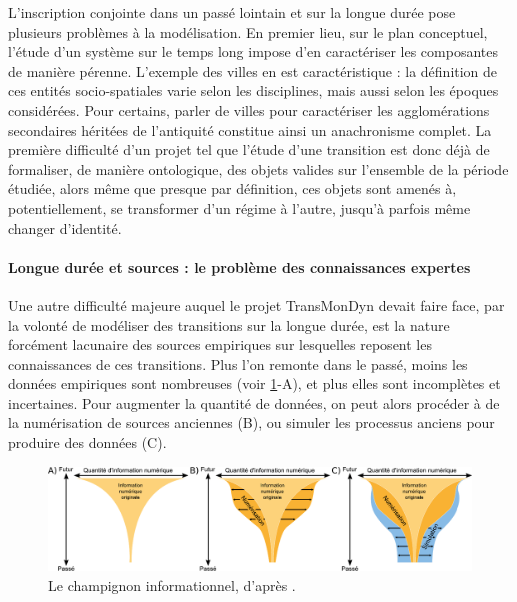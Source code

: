 L'inscription conjointe dans un passé lointain et sur la longue durée pose plusieurs problèmes à la modélisation.
En premier lieu, sur le plan conceptuel, l'étude d'un système sur le temps long impose d'en caractériser les composantes de manière pérenne.
L'exemple des \og villes \fg{} en est caractéristique :
	la définition de ces entités socio-spatiales varie selon les disciplines, mais aussi selon les époques considérées.
Pour certains, parler de villes pour caractériser les agglomérations secondaires héritées de l'antiquité constitue ainsi un anachronisme complet.
La première difficulté d'un projet tel que l'étude d'une transition est donc déjà de formaliser, de manière ontologique, des objets valides sur l'ensemble de la période étudiée, alors même que presque par définition, ces objets sont amenés à, potentiellement, se transformer d'un régime à l'autre, jusqu'à parfois même changer d'identité.

\paragraph{Longue durée et sources : le problème des \og connaissances expertes\fg{}}

Une autre difficulté majeure auquel le projet TransMonDyn devait faire face, par la volonté de modéliser des transitions sur la longue durée, est la nature forcément lacunaire des sources empiriques sur lesquelles reposent les connaissances de ces transitions.
Plus l'on remonte dans le passé, moins les données empiriques sont nombreuses (voir \cref{fig:champignon-kaplan}-A), et plus elles sont incomplètes et incertaines.
Pour augmenter la quantité de données, on peut alors procéder à de la numérisation de sources anciennes (B), ou simuler les processus anciens pour produire des données (C).

\begin{figure}[H]
	\centering
	\includegraphics[width=\linewidth]{img/champignon_informationnel_kaplan.pdf}
	\caption{Le \og champignon informationnel\fg{}, d'après \textcite{kaplan_lancement_2013}.}
	\label{fig:champignon-kaplan}
\end{figure}

